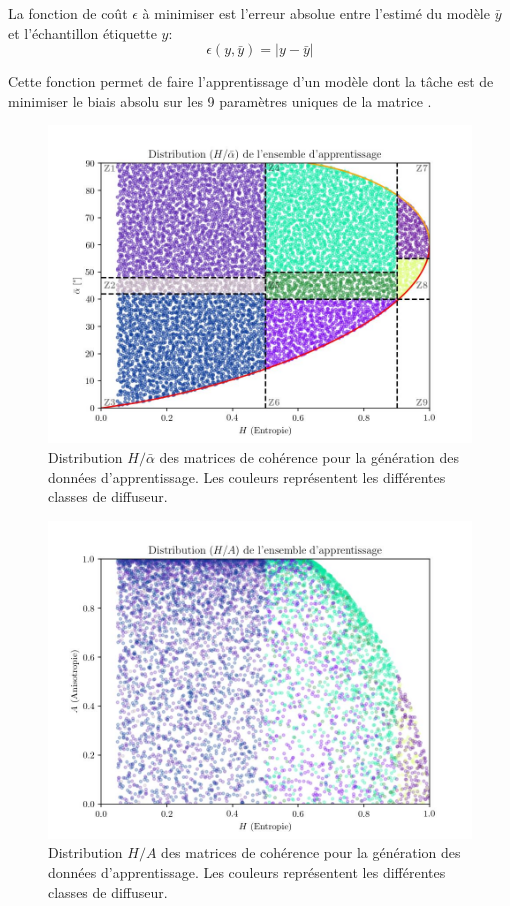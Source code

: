 La fonction de coût $\epsilon$ à minimiser est l'erreur absolue entre l'estimé du modèle $\bar{y}$ et l'échantillon étiquette $y$: 
\begin{equation}
    \epsilon (y, \bar{y})= | y - \bar{y}|
\end{equation}

Cette fonction permet de faire l'apprentissage d'un modèle dont la tâche est de minimiser le biais absolu sur les 9 paramètres uniques de la matrice \matcoh.

\begin{figure}
    \centering
    \includegraphics[width=0.85\linewidth]{figures/Chap3/train_covmatHAlpha.jpg}
    \centering
    \caption{
    \small{ 
    Distribution $H/\bar{\alpha}$ des matrices de cohérence pour la génération des données d'apprentissage.  Les couleurs représentent les différentes classes de diffuseur.}
    }
    \label{fig:distribution_halpha_sigs}
\end{figure}

\begin{figure}
    \centering
    \includegraphics[width=0.85\linewidth]{figures/Chap3/train_covmatHA.jpg}
        \centering
     \caption
     {\small{ Distribution $H/A$ des matrices de cohérence pour la génération des données d'apprentissage.  Les couleurs représentent les différentes classes de diffuseur.
     }}
    \label{fig:distribution_ha_sigs}
\end{figure}



